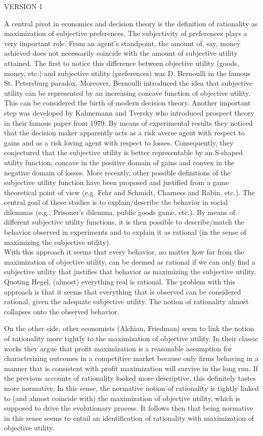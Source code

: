 \documentclass[fleqn,reqno,11pt]{article}
\begin{document}
VERSION 1

A central pivot in economics and decision theory is the definition of rationality as maximization of subjective preferences. The subjectivity of preferences plays a very important role. From an agent's standpoint, the amount of, say, money achieved does not necessarily coincide with the amount of subjective utility attained. The first to notice this difference between objective utility (goods, money, etc.) and subjective utility (preferences) was D. Bernoulli in the famous St. Petersburg paradox. Moreover, Bernoulli introduced the idea that subjective utility can be represented by an increasing concave function of objective utility. This can be considered the birth of modern decision theory.
Another important step was developed by Kahnemann and Tversky who introduced prospect theory in their famous paper from 1979. By means of experimental results they noticed that the decision maker apparently acts as a risk averse agent with respect to gains and as a risk loving agent with respect to losses. Consequently, they conjectured that the subjective utility is better representable by an S-shaped utility function, concave in the positive domain of gains and convex in the negative domain of losses.
More recently, other possible definitions of the subjective utility function have been proposed and justified from a game theoretical point of view (e.g. Fehr and Schmidt, Charness and Rabin, etc.). The central goal of these studies is to explain/describe the behavior in social dilemmas (e.g., Prisoner's dilemma, public goods game, etc.). By means of different subjective utility functions, it is then possible to describe/match the behavior observed in experiments and to explain it as rational (in the sense of maximizing the subjective utility). \\
With this approach it seems that every behavior, no matter how far from the maximization of objective utility, can be deemed as rational if we can only find a subjective utility that justifies that behavior as maximizing the subjective utility. Quoting Hegel, (almost) everything real is rational. The problem with this approach is that it seems that everything that is observed can be considered rational, given the adequate subjective utility. The notion of rationality almost collapses onto the observed behavior.

On the other side, other economists (Alchian, Friedman) seem to link the notion of rationality more tightly to the maximization of objective utility. In their classic works they argue that profit maximization is a reasonable assumption for characterizing outcomes in a competitive market because only firms behaving in a manner that is consistent with profit maximization will survive in the long run. If the previous accounts of rationality looked more descriptive, this definitely tastes more normative. In this sense, the normative notion of rationality is tightly linked to (and almost coincide with) the maximization of objective utility, which is supposed to drive the evolutionary process. It follows then that being normative in this sense seems to entail an identification of rationality with maximization of objective utility.
\end{document}
